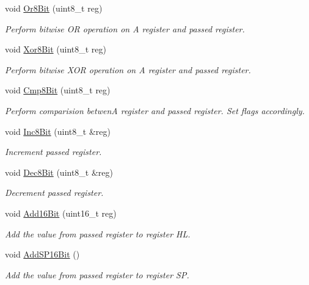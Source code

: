 \begin{DoxyCompactItemize}
void \mbox{\hyperlink{classCPU_af04bdaa9d65413761e931886aabe7421}{Or8\+Bit}} (uint8\+\_\+t reg)
\begin{DoxyCompactList}\small\item\em Perform bitwise OR operation on A register and passed register. \end{DoxyCompactList}\item 
void \mbox{\hyperlink{classCPU_a96829391f528347bce7150c09489ee6f}{Xor8\+Bit}} (uint8\+\_\+t reg)
\begin{DoxyCompactList}\small\item\em Perform bitwise X\+OR operation on A register and passed register. \end{DoxyCompactList}\item 
void \mbox{\hyperlink{classCPU_ad601645204fb0c2061e9de39d42c8feb}{Cmp8\+Bit}} (uint8\+\_\+t reg)
\begin{DoxyCompactList}\small\item\em Perform comparision betwenA register and passed register. Set flags accordingly. \end{DoxyCompactList}\item 
void \mbox{\hyperlink{classCPU_aa227001fff979e13c04b5dd3bea042fd}{Inc8\+Bit}} (uint8\+\_\+t \&reg)
\begin{DoxyCompactList}\small\item\em Increment passed register. \end{DoxyCompactList}\item 
void \mbox{\hyperlink{classCPU_a3cf31a897f91141ae26ee1b1b5cb86d7}{Dec8\+Bit}} (uint8\+\_\+t \&reg)
\begin{DoxyCompactList}\small\item\em Decrement passed register. \end{DoxyCompactList}\item 
void \mbox{\hyperlink{classCPU_aa5a7f8e66efea2e1071c6fbb0e088e1d}{Add16\+Bit}} (uint16\+\_\+t reg)
\begin{DoxyCompactList}\small\item\em Add the value from passed register to register HL. \end{DoxyCompactList}\item 
void \mbox{\hyperlink{classCPU_aca034a9f8f8a900b48acf54398cd67ef}{Add\+S\+P16\+Bit}} ()
\begin{DoxyCompactList}\small\item\em Add the value from passed register to register SP. \end{DoxyCompactList}\item 

\end{DoxyCompactItemize}

